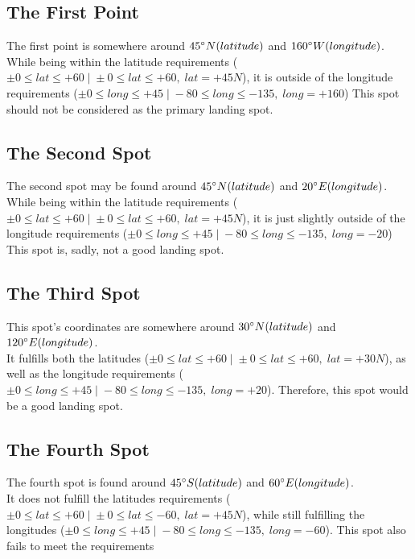 \documentclass{article}
\begin{document}
\subsection{The First Point}
The first point is somewhere around \(45 \degree N (latitude)\) and \(160 \degree W (longitude) \). \\
While being within the latitude requirements (\(\pm 0 \leq lat \leq +60 \;|\; \pm 0 \leq lat \leq +60,\; lat = +45 N\)), it is outside of the longitude requirements (\(  \pm 0 \leq long \leq +45 \;|\; -80 \leq long \leq -135,\; long = +160 \))
This spot should not be considered as the primary landing spot.

\subsection{The Second Spot}
The second spot may be found around \(45 \degree N (latitude)\) and \(20 \degree E (longitude)\). \\
While being within the latitude requirements (\(\pm 0 \leq lat \leq +60 \;|\; \pm 0 \leq lat \leq +60,\; lat = +45 N\)), it is just slightly outside of the longitude requirements (\(  \pm 0 \leq long \leq +45 \;|\; -80 \leq long \leq -135,\; long = -20 \))
This spot is, sadly, not a good landing spot.

\subsection{The Third Spot}
This spot's coordinates are somewhere around \(30 \degree N (latitude)\) and \(120 \degree E (longitude)\). \\
It fulfills both the latitudes (\(\pm 0 \leq lat \leq +60 \;|\; \pm 0 \leq lat \leq +60,\; lat = +30 N\)), as well as the longitude requirements (\(  \pm 0 \leq long \leq +45 \;|\; -80 \leq long \leq -135,\; long = +20 \)).
Therefore, this spot would be a good landing spot.

\subsection{The Fourth Spot}
The fourth spot is found around \(45 \degree S (latitude)\) and \(60 \degree E (longitude)\). \\
It does not fulfill the latitudes requirements (\(\pm 0 \leq lat \leq +60 \;|\; \pm 0 \leq lat \leq -60,\; lat = +45 N\)), while still fulfilling the longitudes (\(  \pm 0 \leq long \leq +45 \;|\; -80 \leq long \leq -135,\; long = -60 \)).
This spot also fails to meet the requirements
\end{document}
